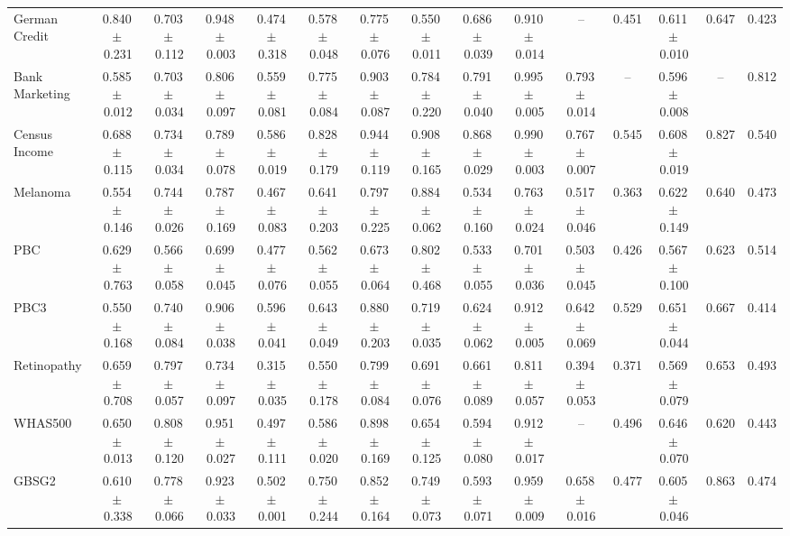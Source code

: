 \documentclass[8pt]{extarticle}
\begin{document}
\begin{longtable}{l*{14}{c}}
German Credit & 0.840\,$\pm$\,0.231 & 0.703\,$\pm$\,0.112 & 0.948\,$\pm$\,0.003 & 0.474\,$\pm$\,0.318 & 0.578\,$\pm$\,0.048 & 0.775\,$\pm$\,0.076 & 0.550\,$\pm$\,0.011 & 0.686\,$\pm$\,0.039 & 0.910\,$\pm$\,0.014 & -- & 0.451 & 0.611\,$\pm$\,0.010 & 0.647 & 0.423 \\
Bank Marketing & 0.585\,$\pm$\,0.012 & 0.703\,$\pm$\,0.034 & 0.806\,$\pm$\,0.097 & 0.559\,$\pm$\,0.081 & 0.775\,$\pm$\,0.084 & 0.903\,$\pm$\,0.087 & 0.784\,$\pm$\,0.220 & 0.791\,$\pm$\,0.040 & 0.995\,$\pm$\,0.005 & 0.793\,$\pm$\,0.014 & -- & 0.596\,$\pm$\,0.008 & -- & 0.812 \\
Census Income & 0.688\,$\pm$\,0.115 & 0.734\,$\pm$\,0.034 & 0.789\,$\pm$\,0.078 & 0.586\,$\pm$\,0.019 & 0.828\,$\pm$\,0.179 & 0.944\,$\pm$\,0.119 & 0.908\,$\pm$\,0.165 & 0.868\,$\pm$\,0.029 & 0.990\,$\pm$\,0.003 & 0.767\,$\pm$\,0.007 & 0.545 & 0.608\,$\pm$\,0.019 & 0.827 & 0.540 \\
Melanoma & 0.554\,$\pm$\,0.146 & 0.744\,$\pm$\,0.026 & 0.787\,$\pm$\,0.169 & 0.467\,$\pm$\,0.083 & 0.641\,$\pm$\,0.203 & 0.797\,$\pm$\,0.225 & 0.884\,$\pm$\,0.062 & 0.534\,$\pm$\,0.160 & 0.763\,$\pm$\,0.024 & 0.517\,$\pm$\,0.046 & 0.363 & 0.622\,$\pm$\,0.149 & 0.640 & 0.473 \\
PBC & 0.629\,$\pm$\,0.763 & 0.566\,$\pm$\,0.058 & 0.699\,$\pm$\,0.045 & 0.477\,$\pm$\,0.076 & 0.562\,$\pm$\,0.055 & 0.673\,$\pm$\,0.064 & 0.802\,$\pm$\,0.468 & 0.533\,$\pm$\,0.055 & 0.701\,$\pm$\,0.036 & 0.503\,$\pm$\,0.045 & 0.426 & 0.567\,$\pm$\,0.100 & 0.623 & 0.514 \\
PBC3 & 0.550\,$\pm$\,0.168 & 0.740\,$\pm$\,0.084 & 0.906\,$\pm$\,0.038 & 0.596\,$\pm$\,0.041 & 0.643\,$\pm$\,0.049 & 0.880\,$\pm$\,0.203 & 0.719\,$\pm$\,0.035 & 0.624\,$\pm$\,0.062 & 0.912\,$\pm$\,0.005 & 0.642\,$\pm$\,0.069 & 0.529 & 0.651\,$\pm$\,0.044 & 0.667 & 0.414 \\
Retinopathy & 0.659\,$\pm$\,0.708 & 0.797\,$\pm$\,0.057 & 0.734\,$\pm$\,0.097 & 0.315\,$\pm$\,0.035 & 0.550\,$\pm$\,0.178 & 0.799\,$\pm$\,0.084 & 0.691\,$\pm$\,0.076 & 0.661\,$\pm$\,0.089 & 0.811\,$\pm$\,0.057 & 0.394\,$\pm$\,0.053 & 0.371 & 0.569\,$\pm$\,0.079 & 0.653 & 0.493 \\
WHAS500 & 0.650\,$\pm$\,0.013 & 0.808\,$\pm$\,0.120 & 0.951\,$\pm$\,0.027 & 0.497\,$\pm$\,0.111 & 0.586\,$\pm$\,0.020 & 0.898\,$\pm$\,0.169 & 0.654\,$\pm$\,0.125 & 0.594\,$\pm$\,0.080 & 0.912\,$\pm$\,0.017 & -- & 0.496 & 0.646\,$\pm$\,0.070 & 0.620 & 0.443 \\
GBSG2 & 0.610\,$\pm$\,0.338 & 0.778\,$\pm$\,0.066 & 0.923\,$\pm$\,0.033 & 0.502\,$\pm$\,0.001 & 0.750\,$\pm$\,0.244 & 0.852\,$\pm$\,0.164 & 0.749\,$\pm$\,0.073 & 0.593\,$\pm$\,0.071 & 0.959\,$\pm$\,0.009 & 0.658\,$\pm$\,0.016 & 0.477 & 0.605\,$\pm$\,0.046 & 0.863 & 0.474 \\

\end{longtable}
\end{document}
